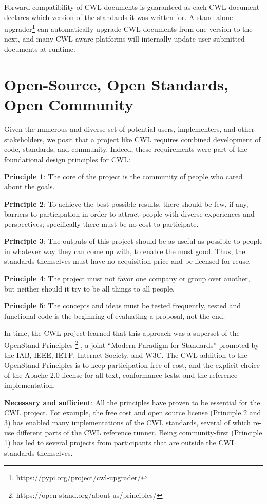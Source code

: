 \documentclass[sigconf,authordraft]{acmart}
\begin{document}
Forward compatibility of CWL documents is guaranteed as each CWL document declares which version of the standards it was written for. A stand alone upgrader\footnote{\url{https://pypi.org/project/cwl-upgrader/}} can automatically upgrade CWL documents from one version to the next, and many CWL-aware platforms will internally update user-submitted documents at runtime.

\section{Open-Source, Open Standards, Open Community}

Given the numerous and diverse set of potential users, implementers, and other stakeholders, we posit that a project like CWL requires combined development of code, standards, and community. Indeed, these requirements were part of the foundational design principles for CWL:

\textbf{Principle 1}: The core of the project is the community of people who cared about the goals.

\textbf{Principle 2}: To achieve the best possible results, there should be few, if any, barriers to participation in order to attract people with diverse experiences and perspectives; specifically there must be no cost to participate.

\textbf{Principle 3}: The outputs of this project should be as useful as possible to people in whatever way they can come up with, to enable the most good. Thus, the standards themselves must have no acquisition price and be licensed for reuse.

\textbf{Principle 4}: The project must not favor one company or group over another, but neither should it try to be all things to all people.

\textbf{Principle 5}: The concepts and ideas must be tested frequently, tested and functional code is the beginning of evaluating a proposal, not the end.

In time, the CWL project learned that this approach was a superset of the OpenStand Principles \footnote{https://open-stand.org/about-us/principles/} , a joint ``Modern Paradigm for Standards'' promoted by the IAB, IEEE, IETF, Internet Society, and W3C. The CWL addition to the OpenStand Principles is to keep participation free of cost, and the explicit choice of the Apache 2.0 license for all text, conformance tests, and the reference implementation.

\textbf{Necessary and sufficient}: All the principles have proven to be essential for the CWL project. For example, the free cost and open source license (Principle 2 and 3) has enabled many implementations of the CWL standards, several of which re-use different parts of the CWL reference runner. Being community-first (Principle 1) has led to several projects from participants that are outside the CWL standards themselves.
\end{document}

